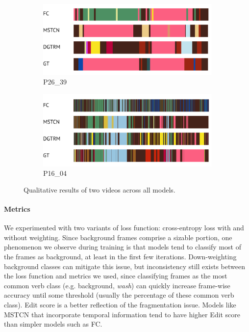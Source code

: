 \begin{figure}[ht!]
\begin{center}
    \begin{minipage}[b]{1\textwidth}
        \begin{subfigure}[b]{0.475\textwidth}
            \centering
            \includegraphics[scale=0.12]{figures/P26_39-comparison.png}
            \caption{P26\_39}
            \label{fig:2639}
        \end{subfigure}\quad
        \begin{subfigure}[b]{0.475\textwidth}
            \centering
            \includegraphics[scale=0.12]{figures/P16_04-comparison.png}
            \caption{P16\_04}
            \label{fig:1604}
        \end{subfigure}
        \caption{Qualitative results of two videos across all models.}
        \label{fig:baseline_qualitative}
    \end{minipage}
\end{center}
\end{figure}

\paragraph{Metrics} 
We experimented with two variants of loss function: cross-entropy loss with and without weighting. Since background frames comprise a sizable portion, one phenomenon we observe during training is that models tend to classify most of the frames as background, at least in the first few iterations. Down-weighting background classes can mitigate this issue, but inconsistency still exists between the loss function and metrics we used, since classifying frames as the most common verb class (e.g. background, \emph{wash}) can quickly increase frame-wise accuracy until some threshold (usually the percentage of these common verb class). Edit score is a better reflection of the fragmentation issue. Models like MSTCN that incorporate temporal information tend to have higher Edit score than simpler models such as FC.  